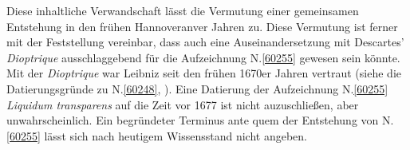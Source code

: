 Diese inhaltliche Verwandschaft lässt die Vermutung einer gemeinsamen Entstehung in den frühen Hannoveranver Jahren zu.
Diese Vermutung ist ferner mit der Feststellung vereinbar, dass auch eine Auseinandersetzung mit Descartes' \textit{Dioptrique}\cite{00038} ausschlaggebend für die Aufzeichnung N.\;\ref{60255} gewesen sein könnte.
Mit der \textit{Dioptrique}\cite{00038} war Leibniz seit den frühen 1670er Jahren vertraut (siehe die Datierungsgründe zu N.\;\ref{60248}, \pageref{60248_dat}).
\pend%
\pstart%
Eine Datierung der Aufzeichnung N.\;\ref{60255} \textit{Liquidum transparens} auf die Zeit vor 1677 %
ist nicht auzuschließen, aber unwahrscheinlich.
Ein begründeter Terminus ante quem der Entstehung von N.\;\ref{60255} lässt sich nach heutigem Wissensstand nicht angeben.
\pend%
%
\frenchspacing%
\normalsize%
